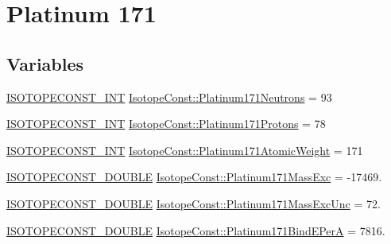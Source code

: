 \hypertarget{group___isotope_const-_platinum-_pt171}{}\section{Platinum 171}
\label{group___isotope_const-_platinum-_pt171}
\subsection*{Variables}
\begin{DoxyCompactItemize}
\item 
\mbox{\hyperlink{group___isotope_const-_macros_ga5f18360b3e99483a35c32d789e62621c}{I\+S\+O\+T\+O\+P\+E\+C\+O\+N\+S\+T\+\_\+\+I\+NT}} \mbox{\hyperlink{group___isotope_const-_platinum-_pt171_ga9218359d7026bc1018a598552179cd40}{Isotope\+Const\+::\+Platinum171\+Neutrons}} = 93
\item 
\mbox{\hyperlink{group___isotope_const-_macros_ga5f18360b3e99483a35c32d789e62621c}{I\+S\+O\+T\+O\+P\+E\+C\+O\+N\+S\+T\+\_\+\+I\+NT}} \mbox{\hyperlink{group___isotope_const-_platinum-_pt171_ga71da7595cdd422666b935ec9ed6a0890}{Isotope\+Const\+::\+Platinum171\+Protons}} = 78
\item 
\mbox{\hyperlink{group___isotope_const-_macros_ga5f18360b3e99483a35c32d789e62621c}{I\+S\+O\+T\+O\+P\+E\+C\+O\+N\+S\+T\+\_\+\+I\+NT}} \mbox{\hyperlink{group___isotope_const-_platinum-_pt171_gad5e32bf266f44f48c71497a9f1c02251}{Isotope\+Const\+::\+Platinum171\+Atomic\+Weight}} = 171
\item 
\mbox{\hyperlink{group___isotope_const-_macros_ga8f45a7272ce02c0b4c65c44636ed719a}{I\+S\+O\+T\+O\+P\+E\+C\+O\+N\+S\+T\+\_\+\+D\+O\+U\+B\+LE}} \mbox{\hyperlink{group___isotope_const-_platinum-_pt171_gaf8451610fa2af4ca5a83cda0adcd2fb3}{Isotope\+Const\+::\+Platinum171\+Mass\+Exc}} = -\/17469.
\item 
\mbox{\hyperlink{group___isotope_const-_macros_ga8f45a7272ce02c0b4c65c44636ed719a}{I\+S\+O\+T\+O\+P\+E\+C\+O\+N\+S\+T\+\_\+\+D\+O\+U\+B\+LE}} \mbox{\hyperlink{group___isotope_const-_platinum-_pt171_ga4875d72ab24ec1b653f6c68b185e0cc7}{Isotope\+Const\+::\+Platinum171\+Mass\+Exc\+Unc}} = 72.
\item 
\mbox{\hyperlink{group___isotope_const-_macros_ga8f45a7272ce02c0b4c65c44636ed719a}{I\+S\+O\+T\+O\+P\+E\+C\+O\+N\+S\+T\+\_\+\+D\+O\+U\+B\+LE}} \mbox{\hyperlink{group___isotope_const-_platinum-_pt171_ga3e29485c6108e54fdb9600769354c380}{Isotope\+Const\+::\+Platinum171\+Bind\+E\+PerA}} = 7816.
\item 

\end{DoxyCompactItemize}
